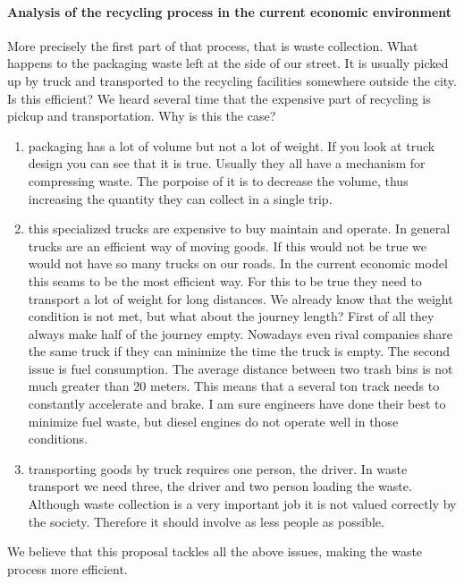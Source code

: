 \documentclass{article}
\begin{document}
\paragraph{Analysis of the recycling process in the current economic environment}
More precisely the first part of that process, that is waste collection.
What happens to the packaging waste left at the side of our street.
It is usually picked up by truck and transported to the recycling facilities somewhere outside the city.
Is this efficient?
We heard several time that the expensive part of recycling is pickup and transportation.
Why is this the case?
\begin{enumerate}
\item packaging has a lot of volume but not a lot of weight.
If you look at truck design you can see that it is true.
Usually they all have a mechanism for compressing waste.
The porpoise of it is to decrease the volume, thus increasing the quantity they can collect in a single trip.
\item this specialized trucks are expensive to buy maintain and operate.
In general trucks are an efficient way of moving goods.
If this would not be true we would not have so many trucks on our roads.
In the current economic model this seams to be the most efficient way.
For this to be true they need to transport a lot of weight for long distances.
We already know that the weight condition is not met, but what about the journey length?
First of all they always make half of the journey empty.
Nowadays even rival companies share the same truck if they can minimize the time the truck is empty.
The second issue is fuel consumption.
The average distance between two trash bins is not much greater than 20 meters.
This means that a several ton track needs to constantly accelerate and brake.
I am sure engineers have done their best to minimize fuel waste, but diesel engines do not operate well in those conditions.
\item transporting goods by truck requires one person, the driver.
In waste transport we need three, the driver and two person loading the waste.
Although waste collection is a very important job it is not valued correctly by the society.
Therefore it should involve as less people as possible.
\end{enumerate}
We believe that this proposal tackles all the above issues, making the waste process more efficient.
\end{document}
